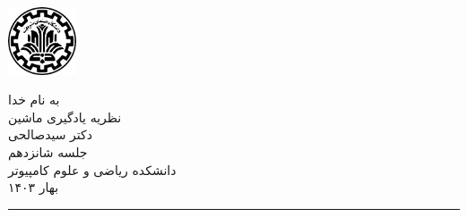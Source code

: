 \begin{minipage}{0.1\textwidth}
\includegraphics[width=2cm]{etc/sut}
\end{minipage}%
\hfill%
\begin{minipage}{0.6\textwidth}\centering
\fontsize{10pt}{10pt}\selectfont
به‌ نام خدا \\
نظریه یادگیری ماشین \\
دکتر سیدصالحی\\
جلسه شانزدهم \\
\vspace{0.25cm}
\begingroup
\fontsize{8pt}{8pt}\selectfont
دانشکده ریاضی و علوم کامپیوتر \\
بهار ۱۴۰۳ \\
\endgroup
\end{minipage}%
\hfill%
\begin{minipage}{0.1\textwidth}
\end{minipage}

\vspace{0.5cm}

\noindent\rule{\textwidth}{1pt}